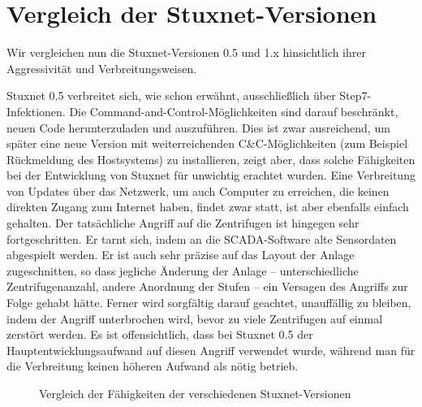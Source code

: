 \documentclass[a4paper]{article}
\begin{document}

\section{Vergleich der Stuxnet-Versionen}

Wir vergleichen nun die Stuxnet-Versionen 0.5 und 1.x hinsichtlich ihrer Aggressivität und Verbreitungsweisen.

Stuxnet 0.5 verbreitet sich, wie schon erwähnt, ausschließlich über Step7-Infektionen.
Die Command-and-Control-Möglichkeiten sind darauf beschränkt, neuen Code herunterzuladen und auszuführen.
Dies ist zwar ausreichend, um später eine neue Version mit weiterreichenden C\&C-Möglichkeiten (zum Beispiel Rück\-mel\-dung des Hostsystems) zu installieren,
zeigt aber, dass solche Fähigkeiten bei der Entwicklung von Stuxnet für unwichtig erachtet wurden.
Eine Verbreitung von Updates über das Netzwerk, um auch Computer zu erreichen, die keinen direkten Zugang zum Internet haben,
findet zwar statt, ist aber ebenfalls einfach gehalten.
Der tatsächliche Angriff auf die Zentrifugen ist hingegen sehr fortgeschritten.
Er tarnt sich, indem an die SCADA-Software alte Sensordaten abgespielt werden.
Er ist auch sehr präzise auf das Layout der Anlage zugeschnitten, so dass jegliche Änderung der Anlage – unterschiedliche Zentrifugenanzahl, andere Anordnung der Stufen – ein Versagen des Angriffs zur Folge gehabt hätte.
Ferner wird sorgfältig darauf geachtet, unauffällig zu bleiben, indem der Angriff unterbrochen wird, bevor zu viele Zentrifugen auf einmal zerstört werden.
Es ist offensichtlich, dass bei Stuxnet 0.5 der Hauptentwicklungsaufwand auf diesen Angriff verwendet wurde,
während man für die Verbreitung keinen höheren Aufwand als nötig betrieb.

\begin{figure}
  \centering
  
  \caption{Vergleich der Fähigkeiten der verschiedenen Stuxnet-Versionen\label{fig:vergleich}}
\end{figure}
\end{document}
